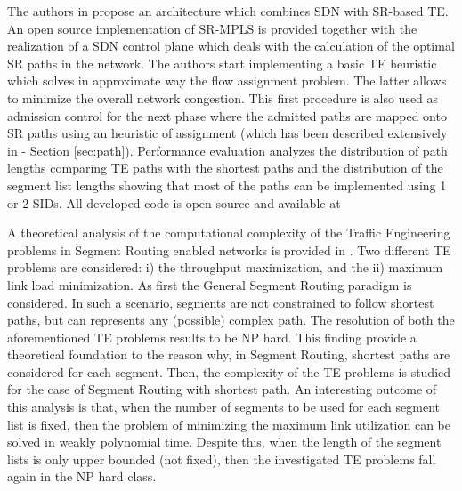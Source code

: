 The authors in \cite{trafficpmsr} propose an architecture which combines SDN with SR-based TE. An open source implementation of SR-MPLS is provided together with the realization of a SDN control plane which deals with the calculation of the optimal SR paths in the network. The authors start implementing a basic TE heuristic which solves in approximate way the flow assignment problem. The latter allows to minimize the overall network congestion. This first procedure is also used as admission control for the next phase where the admitted paths are mapped onto SR paths using an heuristic of assignment (which has been described extensively in \cite{pmsr} - Section \ref{sec:path}). Performance evaluation analyzes the distribution of path lengths comparing TE paths with the shortest paths and the distribution of the segment list lengths showing that most of the paths can be implemented using 1 or 2 SIDs. All developed code is open source and available at \cite{pmsrcode}

A theoretical analysis of the computational complexity of the Traffic Engineering problems in Segment Routing enabled networks is provided in \cite{ontraffic}.
Two different TE problems are considered: i) the throughput maximization, and the ii) maximum link load minimization.
As first the General Segment Routing paradigm is considered.
In such a scenario, segments are not constrained to follow shortest paths, but can represents any (possible) complex path.
The resolution of both the aforementioned TE problems results to be NP hard.
This finding provide a theoretical foundation to the reason why, in Segment Routing, shortest paths are considered for each segment.
Then, the complexity of the TE problems is studied for the case of Segment Routing with shortest path.
An interesting outcome of this analysis is that, when the number of segments to be used for each segment list is fixed, then the problem of minimizing the maximum link utilization can be solved in weakly polynomial time.
Despite this, when the length of the segment lists is only upper bounded (not fixed), then the investigated TE problems fall again in the NP hard class.

